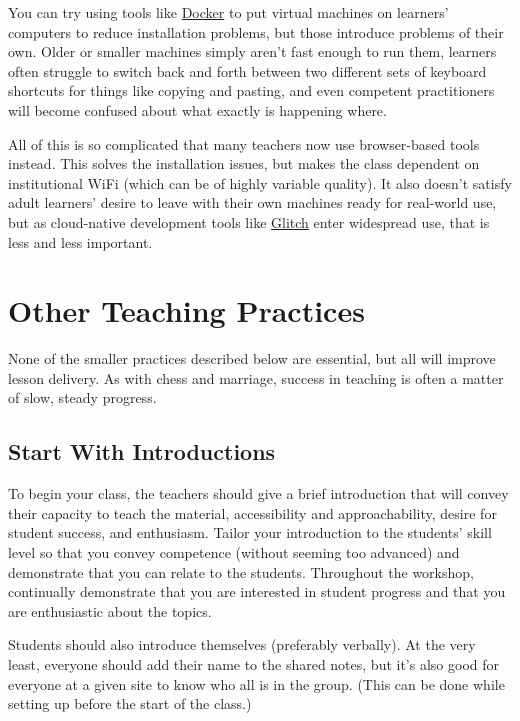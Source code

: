 You can try using tools like \href{http://docker.com}{Docker} to put
virtual machines on learners' computers to reduce installation
problems, but those introduce problems of their own.  Older or smaller
machines simply aren't fast enough to run them, learners often
struggle to switch back and forth between two different sets of
keyboard shortcuts for things like copying and pasting, and even
competent practitioners will become confused about what exactly is
happening where.

All of this is so complicated that many teachers now use browser-based
tools instead. This solves the installation issues, but makes the
class dependent on institutional WiFi (which can be of highly variable
quality).  It also doesn't satisfy adult learners' desire to leave
with their own machines ready for real-world use, but as cloud-native
development tools like \href{https://glitch.com/}{Glitch} enter
widespread use, that is less and less important.

\section{Other Teaching Practices}\label{s:classroom-practices}

None of the smaller practices described below are essential, but all
will improve lesson delivery.  As with chess and marriage, success in
teaching is often a matter of slow, steady progress.

\subsection*{Start With Introductions}

To begin your class, the teachers should give a brief introduction
that will convey their capacity to teach the material, accessibility
and approachability, desire for student success, and enthusiasm.
Tailor your introduction to the students' skill level so that you
convey competence (without seeming too advanced) and demonstrate that
you can relate to the students. Throughout the workshop, continually
demonstrate that you are interested in student progress and that you
are enthusiastic about the topics.

Students should also introduce themselves (preferably verbally). At
the very least, everyone should add their name to the shared notes,
but it's also good for everyone at a given site to know who all is in
the group.  (This can be done while setting up before the start of the
class.)

